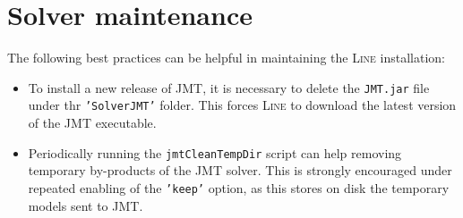 
\section{Solver maintenance}
The following best practices can be helpful in maintaining the \textsc{Line} installation:
\begin{itemize}
\item To install a new release of JMT, it is necessary to delete the \texttt{JMT.jar} file under thr \texttt{'SolverJMT'} folder. This forces \textsc{Line} to download the latest version of the JMT executable.
\item Periodically running the \texttt{jmtCleanTempDir} script can help removing temporary by-products of the JMT solver. This is strongly encouraged under repeated enabling of the \texttt{'keep'} option, as this stores on disk the temporary models sent to JMT.
\end{itemize}

